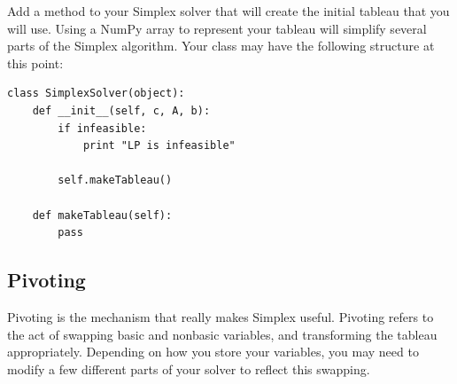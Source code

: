 \begin{problem}
Add a method to your Simplex solver that will create the initial tableau that you will use.
Using a NumPy array to represent your tableau will simplify several parts of the Simplex algorithm.
Your class may have the following structure at this point:
\begin{lstlisting}
class SimplexSolver(object):
    def __init__(self, c, A, b):
        if infeasible:
            print "LP is infeasible"

        self.makeTableau()

    def makeTableau(self):
        pass
\end{lstlisting}
\label{prob:maketableau}
\end{problem}

\subsection{Pivoting}
Pivoting is the mechanism that really makes Simplex useful.
Pivoting refers to the act of swapping basic and nonbasic variables, and transforming the tableau appropriately.
Depending on how you store your variables, you may need to modify a few different parts of your solver to reflect this swapping.

